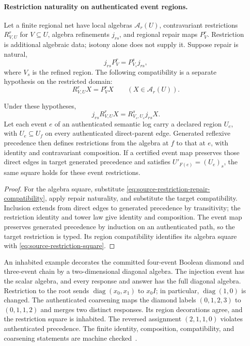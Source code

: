 \paragraph{Restriction naturality on authenticated event regions.}
\label{sec:source-restriction-naturality}

Let a finite regional net have local algebras $\mathcal A_r(U)$,
contravariant restrictions $R^r_{V,U}$ for $V\subseteq U$, algebra
refinements $j_{rs}$, and regional repair maps $P^r_V$.  Restriction is
additional algebraic data; isotony alone does not supply it.  Suppose repair
is natural,
\[
 j_{rs}P^r_V=P^s_{V_s}j_{rs},
\]
where $V_s$ is the refined region.  The following compatibility is a
separate hypothesis on the restricted domain:
\begin{equation}
 R^r_{V,U}X=P^r_VX\qquad(X\in\mathcal A_r(U)).
 \label{eq:source-restriction-repair-compatibility}
\end{equation}

\begin{proposition}
\label{prop:source-restriction-naturality}
Under these hypotheses,
\begin{equation}
 j_{rs}R^r_{V,U}X=R^s_{V_s,U_s}j_{rs}X.
 \label{eq:source-restriction-square}
\end{equation}
Let each event $e$ of an authenticated semantic log carry a declared region
$U_e$, with $U_e\subseteq U_f$ on every authenticated direct-parent edge.
Generated reflexive precedence then defines restrictions from the algebra
at $f$ to that at $e$, with identity and contravariant composition.  If a
certified event map preserves those direct edges in target generated
precedence and satisfies $U'_{F(e)}=(U_e)_s$, the same square holds for these
event restrictions.
\end{proposition}

\begin{proof}
For the algebra square, substitute
\eqref{eq:source-restriction-repair-compatibility}, apply repair naturality,
and substitute the target compatibility.  Inclusion extends from direct
edges to generated precedence by transitivity; the restriction identity and
tower law give identity and composition.  The event map preserves generated
precedence by induction on an authenticated path, so the target restriction
is typed.  Its region compatibility identifies its algebra square with
\eqref{eq:source-restriction-square}.
\end{proof}

An inhabited example decorates the committed four-event Boolean diamond
and three-event chain by a two-dimensional diagonal algebra.  The injection
event has the scalar algebra, and every response and answer has the full
diagonal algebra.  Restriction to the root sends
$\operatorname{diag}(x_0,x_1)$ to $x_0I$; in particular,
$\operatorname{diag}(1,0)$ is changed.  The authenticated coarsening maps
the diamond labels $(0,1,2,3)$ to $(0,1,1,2)$ and merges two distinct
responses.  Its region decorations agree, and the restriction square is
inhabited.  The reversed assignment $(2,1,1,0)$ violates authenticated
precedence.  The finite identity, composition, compatibility, and coarsening
statements are machine checked~\cite{ophrepo}.

